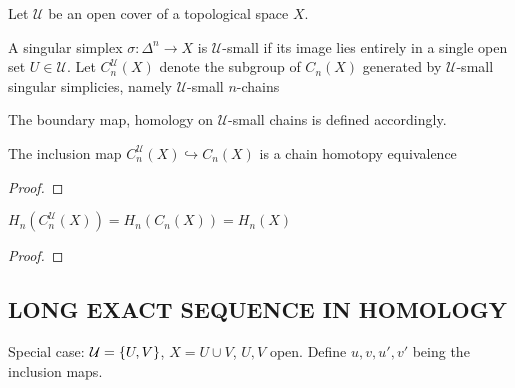 \documentclass{report}
\begin{document}
Let $\mathcal{U}$ be an open cover of a topological space $X$.

\begin{definition}
    A singular simplex $\sigma: \Delta^n \to X$ is $\mathcal{U}$-small if its image lies entirely in a single open set $U \in \mathcal{U}$. Let $C_n^\mathcal{U}(X)$ denote the subgroup of $C_n(X)$ generated by $\mathcal{U}$-small singular simplicies, namely $\mathcal{U}$-small $n$-chains 

    \begin{center}
    \end{center}
    The boundary map, homology on $\mathcal{U}$-small chains is defined accordingly.
\end{definition}

\begin{theorem}
    The inclusion map $C_n^\mathcal{U}(X) \hookrightarrow C_n(X)$ is a chain homotopy equivalence
\end{theorem}

\begin{proof}
\end{proof}

\begin{corollary}
    $H_n(C_n^\mathcal{U}(X)) = H_n(C_n(X)) = H_n(X)$
\end{corollary}

\begin{proof}
\end{proof}

\subsection{LONG EXACT SEQUENCE IN HOMOLOGY}

Special case: $\mathcal{U} = \{U, V\}$, $X = U \cup V$, $U, V$ open. Define $u, v, u', v'$ being the inclusion maps.

\begin{center}
\end{center}
\end{document}
